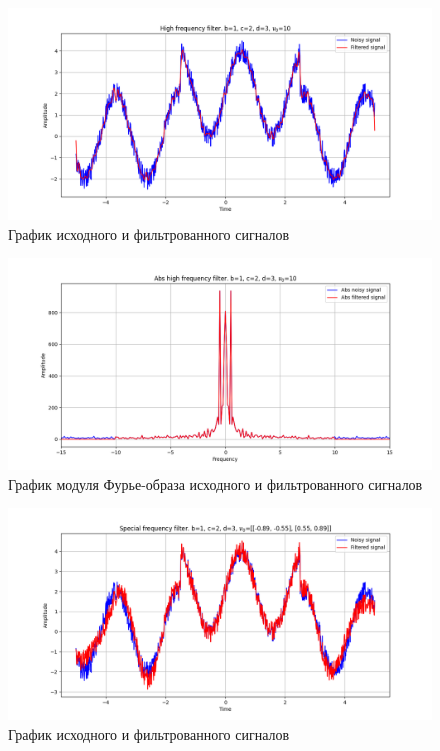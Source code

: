 \documentclass[a4paper, 12pt]{article}
\begin{document}
    \begin{figure}[!htb]
        \centering
        \includegraphics[scale=0.485]{6_u_flt_u_nospec.png}
        \captionsetup{skip=0pt}
        \caption{График исходного и фильтрованного сигналов}
        \label{fig:fig99}
    \end{figure}
    \begin{figure}[!htb]
        \centering
        \includegraphics[scale=0.485]{6_abs_u_U_nospec.png}
        \captionsetup{skip=0pt}
        \caption{График модуля Фурье-образа исходного и фильтрованного сигналов}
        \label{fig:fig100}
    \end{figure}
    \begin{figure}[!htb]
        \centering
        \includegraphics[scale=0.485]{6_1_u_flt_u_nospec.png}
        \captionsetup{skip=0pt}
        \caption{График исходного и фильтрованного сигналов}
        \label{fig:fig101}
    \end{figure}
\end{document}
